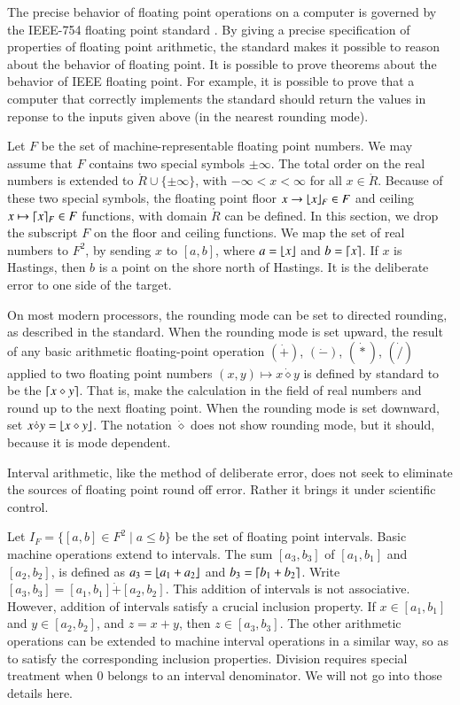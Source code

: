 The precise behavior of floating point operations on a computer is governed by 
the IEEE-754 floating point standard \cite{Gol}.  
By giving a precise specification of properties
of floating point arithmetic, the standard makes it possible to reason about the
behavior of floating point.  It is possible to prove theorems about the behavior
of IEEE floating point.  For example, it is possible to prove that a computer that
correctly implements the standard should return the values in reponse to the inputs
given above (in the nearest rounding mode).  

Let $F$ be the set of machine-representable floating point numbers.  We may assume that $F$ contains two 
 special symbols $\pm\infty$.  The total order on the real numbers is extended to $\ring{R}\cup\{\pm\infty\}$, with $-\infty < x < \infty$ for all $x\in\ring{R}$.
Because of these two special symbols, the floating point floor $x\to\lfloor x\rfloor_F\in F$ and ceiling $x\mapsto\lceil x\rceil_F\in F$ functions, with domain $\ring{R}$ can be defined.   In this section, we drop the subscript $F$ on the
floor and ceiling functions.
We map the set of real numbers to $F^2$, by
sending $x$ to $[a,b]$, where $a = \lfloor x\rfloor$ and $b=\lceil x\rceil$.
If $x$ is Hastings, then $b$ is a point
on the shore north of Hastings.  It is the deliberate error to one side of the target.


On most modern processors, the rounding mode can be set to directed rounding, as
described in the standard.   When the rounding mode is set upward, the result of
any basic arithmetic floating-point operation $(\dot +)$, $(\dot -)$, $(\dot *)$, $(\dot /)$ applied to two floating
point numbers $(x,y)\mapsto x\dot\diamond y$ is defined by standard to be 
the $\lceil x\diamond y\rceil$.  That is, make the calculation in the field of real numbers and round up to the next floating point.
When the rounding mode is set downward, 
set $x\dot\diamond y = \lfloor x\diamond y\rfloor$.  The notation $\dot\diamond$ does not
show rounding mode, but it should, because it is mode dependent.


Interval arithmetic, like the method of deliberate error, does not seek to eliminate
the sources of floating point round off error.  Rather it brings it under scientific
control.  


Let $I_F = \{[a,b] \in F^2 \mid a \le b\}$ be the set of floating point intervals.
Basic machine operations extend to intervals.  The sum $[a_3,b_3]$ of
$[a_1,b_1]$ and $[a_2,b_2]$, is defined as $a_3=\lfloor a_1+a_2\rfloor$ and
$b_3 = \lceil b_1+b_2\rceil$.  Write $[a_3,b_3] = [a_1,b_1] \dot+ [a_2,b_2]$.
This addition of intervals
is not associative.  However, addition of intervals satisfy a crucial inclusion property.
If $x\in[a_1,b_1]$ and $y\in [a_2,b_2]$, and $z = x+y$,
then $z\in [a_3,b_3]$.  The other arithmetic operations can be extended to machine
interval operations in a similar way, so as to satisfy the corresponding inclusion
properties.  Division requires special treatment when $0$ belongs to an interval
denominator.  We will not go into those details here.  

